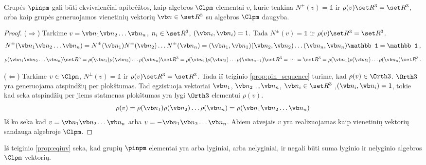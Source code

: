 \begin{proposition}
	\label{prop:eqiuv}
	Grupės $\pinpm$ gali būti ekvivalenčiai apibrėžtos,
	kaip algebros $\Clpm$ elementai $v$, kurie tenkina $N^\pm(v) = \mathbb1$ ir $\rho(v)\set R^3 = \set R^3$,
	arba kaip grupės generuojamos vienetinių vektorių $\vb n \in \set R^3$ su algebros $\Clpm$ daugyba.
\end{proposition}
\begin{proof}
	($\Rightarrow$) Tarkime $v = \vb n_1 \vb n_2 \dots \vb n_n$,
	$n_i \in \set R^3$, $(\vb n_i,\vb n_i)=1$.
	Tada $N^\pm(v) = \mathbb1$ ir $\rho(v)\set R^3 = \set R^3$.
	\begin{equation}
		\begin{aligned}
			N^\pm(\vb n_1 \vb n_2 \dots \vb n_n) 
			=  
			N^\pm(\vb n_1) N^\pm(\vb n_2) \dots N^\pm(\vb n_n) 
			=
			(\vb n_1,\vb n_1)(\vb n_2,\vb n_2)\dots(\vb n_n,\vb n_n) \mathbb1
			=
			\mathbb1
			\,,
		\end{aligned}
	\end{equation}
	\begin{equation}
		\begin{aligned}
			\rho(\vb n_1 \vb n_2 \dots \vb n_n)\set R^3
			=\rho(\vb n_1) \rho(\vb n_2) \dots \rho(\vb n_n)\set R^3
			=\rho(\vb n_1) \rho(\vb n_2) \dots \rho(\vb n_{n-1})\set R^3
			= \dots 
			= \set R^3
			=\rho(\vb n_1) \rho(\vb n_2) \dots \rho(\vb n_n)\set R^3
			\,.
		\end{aligned}
	\end{equation}

	($\Leftarrow$) Tarkime $v\in\Clpm$, $N^\pm(v)=\mathbb1$ ir $\rho(v)\set R^3 = \set R^3$.
	Tada iš teiginio \ref{prop:pin_sequence} turime, kad $\rho(v) \in \Orth3$.
	$\Orth3$ yra generuojama atspindžių per plokštumas.
	Tad egzistuoja vektoriai $\vb n_1$, $\vb n_2$ \dots $\vb n_n$, $\vb n_i \in \set R^3$ ,$(\vb n_i, \vb n_i)=1$,
	tokie kad seka atspindžių per jiems statmenas plokštumas yra lygi $\Orth3$ elementui $\rho(v)$.
	\begin{equation}
		\rho(v) = \rho(\vb n_1) \rho(\vb n_2) \dots \rho(\vb n_n) = \rho(\vb n_1 \vb n_2 \dots \vb n_n)
	\end{equation}
	Iš ko seka kad $v = \vb n_1 \vb n_2 \dots \vb n_n$ arba $v=-\vb n_1 \vb n_2 \dots \vb n_n$.
	Abiem atvejais $v$ yra realizuojamas kaip vienetinių vektorių sandauga algebroje $\Clpm$.
\end{proof}

\begin{corollary}
	Iš teiginio \ref{prop:eqiuv} seka, kad grupių $\pinpm$ elementai yra arba lyginiai, arba nelyginiai,
	ir negali būti suma lyginio ir nelyginio algebros $\Clpm$ vektorių.
\end{corollary}


